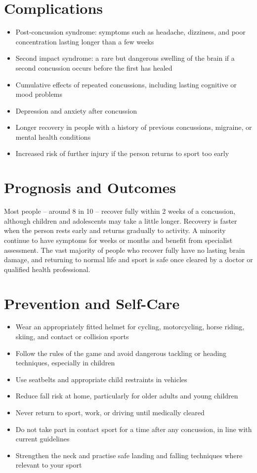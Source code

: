 \section*{Complications}
\begin{itemize}
    \item Post-concussion syndrome: symptoms such as headache, dizziness, and poor concentration lasting longer than a few weeks
    \item Second impact syndrome: a rare but dangerous swelling of the brain if a second concussion occurs before the first has healed
    \item Cumulative effects of repeated concussions, including lasting cognitive or mood problems
    \item Depression and anxiety after concussion
    \item Longer recovery in people with a history of previous concussions, migraine, or mental health conditions
    \item Increased risk of further injury if the person returns to sport too early
\end{itemize}

\section*{Prognosis and Outcomes}
Most people -- around 8 in 10 -- recover fully within 2 weeks of a concussion, although children and adolescents may take a little longer. Recovery is faster when the person rests early and returns gradually to activity. A minority continue to have symptoms for weeks or months and benefit from specialist assessment. The vast majority of people who recover fully have no lasting brain damage, and returning to normal life and sport is safe once cleared by a doctor or qualified health professional.

\section*{Prevention and Self-Care}
\begin{itemize}
    \item Wear an appropriately fitted helmet for cycling, motorcycling, horse riding, skiing, and contact or collision sports
    \item Follow the rules of the game and avoid dangerous tackling or heading techniques, especially in children
    \item Use seatbelts and appropriate child restraints in vehicles
    \item Reduce fall risk at home, particularly for older adults and young children
    \item Never return to sport, work, or driving until medically cleared
    \item Do not take part in contact sport for a time after any concussion, in line with current guidelines
    \item Strengthen the neck and practise safe landing and falling techniques where relevant to your sport
\end{itemize}
